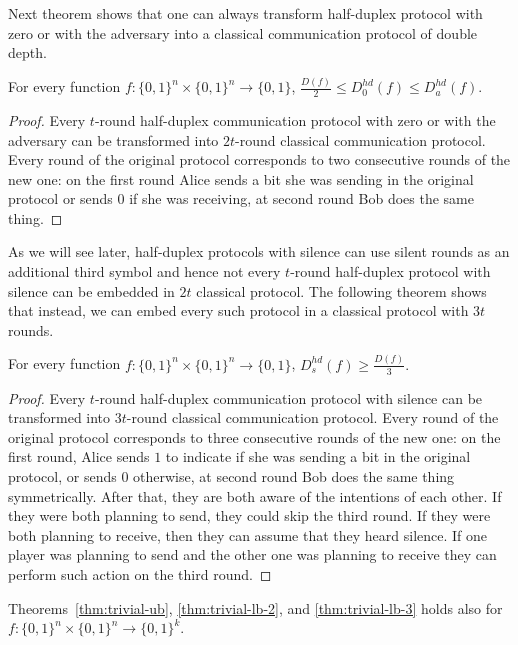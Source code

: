 Next theorem shows that one can always transform half-duplex protocol with zero or with the adversary into
 a classical communication protocol of double depth. 
\begin{theorem}\label{thm:trivial-lb-2}
For every function $f:\{0,1\}^n\times \{0,1\}^n \to \{0,1\}$, 
$\frac{D(f)}{2}\le D^{hd}_0(f) \le D^{hd}_a(f).$
\end{theorem}
\begin{proof}
Every $t$-round half-duplex communication protocol with zero or with the adversary can be transformed into $2t$-round classical communication protocol. Every round of the original protocol corresponds
to two consecutive rounds of the new one: on the first round Alice sends a bit she was sending in the original protocol or sends $0$ if she was receiving, at second round Bob does the same thing.
\end{proof}

As we will see later, half-duplex protocols with silence can use silent rounds as an additional third 
symbol and hence not every $t$-round half-duplex protocol with silence can be embedded in $2t$ 
classical protocol. The following theorem shows that instead, we can embed every such protocol in a classical protocol with $3t$ rounds.
\begin{theorem}\label{thm:trivial-lb-3}
For every function $f:\{0,1\}^n\times \{0,1\}^n \to \{0,1\}$,
$D^{hd}_s(f) \ge \frac{D(f)}{3}.$
\end{theorem}
\begin{proof}
Every $t$-round half-duplex communication protocol with silence can be transformed into $3t$-round
classical communication protocol. Every round of the original protocol corresponds to three consecutive
rounds of the new one: on the first round, Alice sends $1$ to indicate if she was sending a bit in the original protocol, or sends $0$ otherwise, at second round Bob does the same thing symmetrically. After that, they are both aware of the intentions of each other. If they were both planning to send, they could skip the third round. If they were both planning to receive, then they can assume that they heard silence. If one player was planning to send and the other one was planning to receive they can perform such action on the third round.
\end{proof}
\begin{remark}
    Theorems~\ref{thm:trivial-ub}, \ref{thm:trivial-lb-2}, and \ref{thm:trivial-lb-3} holds also for 
    $f:\{0,1\}^n\times\{0,1\}^n\to \{0,1\}^k$.
\end{remark}


